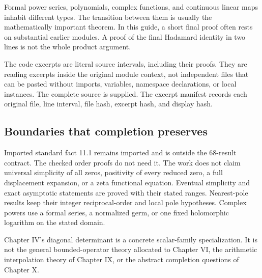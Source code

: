Formal power series, polynomials, complex functions, and continuous linear maps inhabit different types. The transition between them is usually the mathematically important theorem. In this guide, a short final proof often rests on substantial earlier modules. A proof of the final Hadamard identity in two lines is not the whole product argument.

The code excerpts are literal source intervals, including their proofs. They are reading excerpts inside the original module context, not independent files that can be pasted without imports, variables, namespace declarations, or local instances. The complete source is supplied. The excerpt manifest records each original file, line interval, file hash, excerpt hash, and display hash.

\subsection{Boundaries that completion preserves}
Imported standard fact 11.1 remains imported and is outside the 68-result contract. The checked order proofs do not need it. The work does not claim universal simplicity of all zeros, positivity of every reduced zero, a full displacement expansion, or a zeta functional equation. Eventual simplicity and exact asymptotic statements are proved with their stated ranges. Nearest-pole results keep their integer reciprocal-order and local pole hypotheses. Complex powers use a formal series, a normalized germ, or one fixed holomorphic logarithm on the stated domain.

Chapter IV's diagonal determinant is a concrete scalar-family specialization. It is not the general bounded-operator theory allocated to Chapter VI, the arithmetic interpolation theory of Chapter IX, or the abstract completion questions of Chapter X.
